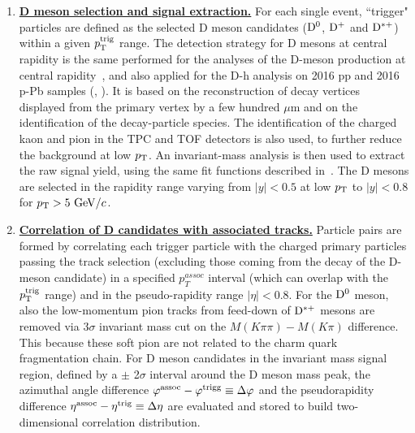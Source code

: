 \begin{enumerate}
\item
\underline {\bf D meson selection and signal extraction.}  For each single event, ``trigger" particles
are defined as the selected  D meson candidates (${\rm D^0}$, ${\rm D^+}$ and ${\rm D^{*+}}$)
within a given $p_{\rm T}^{\rm trig}$ range. The detection strategy for D mesons at central rapidity is
the same performed for the analyses of the D-meson production at central rapidity~\cite{ALICEDmespp7Tev}, and also applied for the D-h analysis on 2016 pp and 2016 p-Pb samples (\cite{Notepp}, \cite{NotepPb}). It is based on the reconstruction of decay
vertices displayed from the primary vertex by a few hundred $\mu$m and on the identification of the decay-particle species.
The identification of the charged kaon and pion in the TPC and TOF detectors is also used, to further reduce the background at low $p_{\rm T}$.  An invariant-mass analysis is then used to extract the raw signal yield, using the same fit functions described in~\cite{ALICEDhcorr}.
The D mesons are selected in the rapidity range varying from $|y|<0.5$ at low $p_{\rm T}$ to $|y|<0.8$ for $p_{\rm T}>5~\mathrm{GeV}/c$. %

\item
\underline{\bf Correlation of D candidates with associated tracks.}
Particle pairs are formed by correlating each trigger particle with the charged primary particles passing the track selection (excluding those coming from the decay of the D-meson candidate) in a specified $p^{assoc}_{T}$ interval (which can overlap with the $p_{\rm T}^{\rm trig}$ range) and in the pseudo-rapidity range $|\eta|<0.8$. For the ${\rm D^0}$ meson, also the low-momentum pion tracks from feed-down of ${\rm D^{*+}}$ mesons are removed via 3$\sigma$ invariant mass cut on the $M(K\pi\pi)-M(K\pi)$ difference. This because these soft pion are not related to the charm quark fragmentation chain.
For D meson candidates in the invariant mass signal region, defined by a $\pm$ 2$\sigma$ interval around the D meson mass peak, the azimuthal angle difference $\varphi^{\rm assoc}-\varphi^{\rm trigg}\equiv\Delta\varphi$
and the pseudorapidity difference $\eta^{\rm assoc}-\eta^{\rm trig}\equiv\Delta \eta$ are evaluated and stored to build two-dimensional correlation distribution. %


\end{enumerate}
